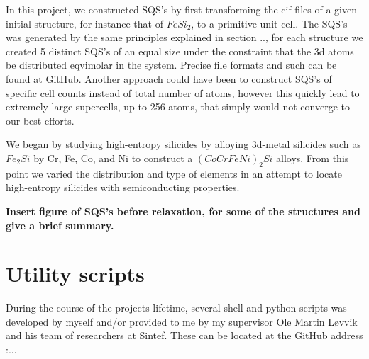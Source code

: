 In this project, we constructed SQS's by first transforming the cif-files of a given initial structure, for instance that of $FeSi_2$, to a primitive unit cell. The SQS's was generated by the same principles explained in section .., for each structure we created 5 distinct SQS's of an equal size under the constraint that the 3d atoms be distributed eqvimolar in the system. Precise file formats and such can be found at GitHub. Another approach could have been to construct SQS's of specific cell counts instead of total number of atoms, however this quickly lead to extremely large supercells, up to 256 atoms, that simply would not converge to our best efforts. 

We began by studying high-entropy silicides by alloying 3d-metal silicides such as $Fe_2Si$ by Cr, Fe, Co, and Ni to construct a $(CoCrFeNi)_2Si$ alloys. From this point we varied the distribution and type of elements in an attempt to locate high-entropy silicides with semiconducting properties.

\textbf{Insert figure of SQS's before relaxation, for some of the structures and give a brief summary.}

\section{Utility scripts}
During the course of the projects lifetime, several shell and python scripts was developed by myself and/or provided to me by my supervisor Ole Martin Løvvik and his team of researchers at Sintef. These can be located at the GitHub address :...